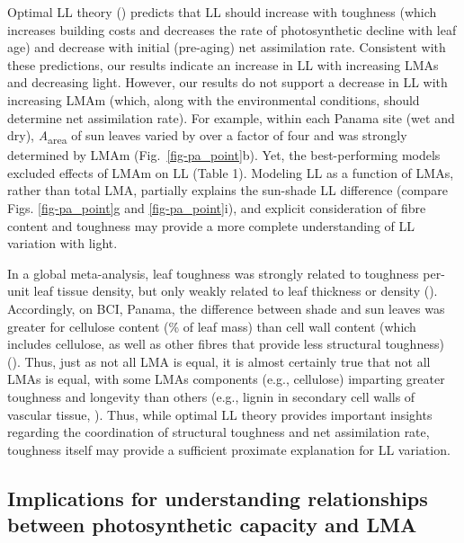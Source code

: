 \documentclass[
  12pt,
  letterpaper,
  DIV=11,
  numbers=noendperiod]{scrartcl}
\begin{document}
Optimal LL theory () predicts
that LL should increase with toughness (which increases building costs
and decreases the rate of photosynthetic decline with leaf age) and
decrease with initial (pre-aging) net assimilation rate. Consistent with
these predictions, our results indicate an increase in LL with
increasing LMAs and decreasing light. However, our results do not
support a decrease in LL with increasing LMAm (which, along with the
environmental conditions, should determine net assimilation rate). For
example, within each Panama site (wet and dry),
\emph{A}\textsubscript{area} of sun leaves varied by over a factor of
four and was strongly determined by LMAm (Fig.~\ref{fig-pa_point}b).
Yet, the best-performing models excluded effects of LMAm on LL (Table
1). Modeling LL as a function of LMAs, rather than total LMA, partially
explains the sun-shade LL difference (compare Figs. \ref{fig-pa_point}g
and \ref{fig-pa_point}i), and explicit consideration of fibre content
and toughness may provide a more complete understanding of LL variation
with light.

In a global meta-analysis, leaf toughness was strongly related to
toughness per-unit leaf tissue density, but only weakly related to leaf
thickness or density ().
Accordingly, on BCI, Panama, the difference between shade and sun leaves
was greater for cellulose content (\% of leaf mass) than cell wall
content (which includes cellulose, as well as other fibres that provide
less structural toughness) (). Thus, just as not all LMA is equal, it is almost certainly true
that not all LMAs is equal, with some LMAs components (e.g., cellulose)
imparting greater toughness and longevity than others (e.g., lignin in
secondary cell walls of vascular tissue,
). Thus, while optimal
LL theory provides important insights regarding the coordination of
structural toughness and net assimilation rate, toughness itself may
provide a sufficient proximate explanation for LL variation.

\subsection{Implications for understanding relationships between
photosynthetic capacity and
LMA}\label{implications-for-understanding-relationships-between-photosynthetic-capacity-and-lma}
\end{document}
